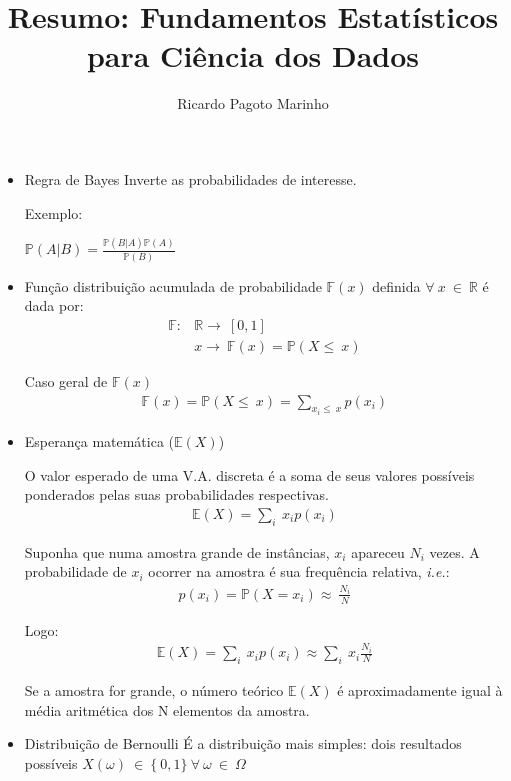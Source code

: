 \documentclass[11pt,a4paper]{book}
\title{Resumo: Fundamentos Estatísticos para Ciência dos Dados}
\author{Ricardo Pagoto Marinho}
\begin{document}
\maketitle
	\begin{itemize}
		\item Regra de Bayes
		Inverte as probabilidades de interesse.
		
		Exemplo:
		
		$\mathbb{P}(A|B) = \frac{\mathbb{P}(B|A)\mathbb{P}(A)}{\mathbb{P}(B)}$
		
		\item Função distribuição acumulada de probabilidade
		$\mathbb{F}(x)$ definida $\forall~x~\in~\mathbb{R}$ é dada por:
		\begin{align*}
			\mathbb{F}: & \mathbb{R}\rightarrow~[0,1]\\
			& x\rightarrow~\mathbb{F}(x)=\mathbb{P}(X\leq~x)
		\end{align*}
		
		Caso geral de $\mathbb{F}(x)$
		\begin{align*}
			\mathbb{F}(x)=\mathbb{P}(X\leq~x)=\sum_{x_i\leq~x}p(x_i)
		\end{align*}
		
		\item Esperança matemática ($\mathbb{E}(X)$)
		
		O valor esperado de uma V.A. discreta é a soma de seus valores possíveis ponderados pelas suas probabilidades respectivas.
		\begin{align*}
			\mathbb{E}(X)=\sum_i~x_ip(x_i)
		\end{align*}
		
		Suponha que numa amostra grande de instâncias, $x_i$ apareceu $N_i$ vezes.
		A probabilidade de $x_i$ ocorrer na amostra é sua frequência relativa, \textit{i.e.}:
		\begin{align*}
			p(x_i)=\mathbb{P}(X=x_i)\approx~\frac{N_i}{N}
		\end{align*}
		
		Logo:
		\begin{align*}
			\mathbb{E}(X)=\sum_i~x_ip(x_i)\approx \sum_i~x_i\frac{N_i}{N}
		\end{align*}
		
		Se a amostra for grande, o número teórico $\mathbb{E}(X)$ é aproximadamente igual à média aritmética dos N elementos da amostra.
		
		\item Distribuição de Bernoulli
		É a distribuição mais simples: dois resultados possíveis
		$X(\omega)~\in~\lbrace~0,1\rbrace~\forall~\omega~\in~\Omega$
		

\end{itemize}
\end{document}
